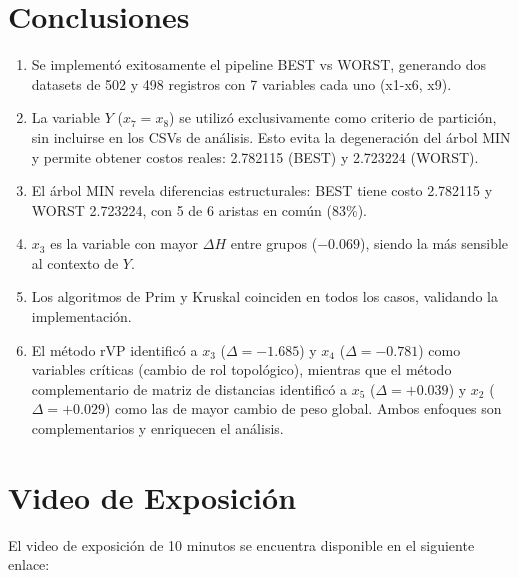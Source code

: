 \documentclass[12pt, a4paper]{article}
\begin{document}
\section{Conclusiones}

\begin{enumerate}
    \item Se implementó exitosamente el pipeline BEST vs WORST,
          generando dos datasets de 502 y 498 registros con 7
          variables cada uno (x1-x6, x9).

    \item La variable $Y$ ($x_7=x_8$) se utilizó exclusivamente como
          criterio de partición, sin incluirse en los CSVs de análisis.
          Esto evita la degeneración del árbol MIN y permite obtener
          costos reales: 2.782115 (BEST) y 2.723224 (WORST).

    \item El árbol MIN revela diferencias estructurales: BEST tiene
          costo 2.782115 y WORST 2.723224,
          con 5 de 6 aristas en común (83\%).

    \item $x_3$ es la variable con mayor $\Delta H$ entre grupos
          ($-0.069$), siendo la más sensible al contexto de $Y$.

    \item Los algoritmos de Prim y Kruskal coinciden en todos los
          casos, validando la implementación.

    \item El método rVP identificó a $x_3$ ($\Delta=-1.685$) y $x_4$
          ($\Delta=-0.781$) como variables críticas (cambio de rol
          topológico), mientras que el método complementario de matriz
          de distancias identificó a $x_5$ ($\Delta=+0.039$) y $x_2$
          ($\Delta=+0.029$) como las de mayor cambio de peso global.
          Ambos enfoques son complementarios y enriquecen el análisis.
\end{enumerate}

\section{Video de Exposición}

El video de exposición de 10 minutos se encuentra disponible en el
siguiente enlace:
\end{document}
